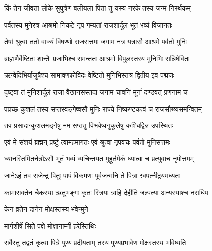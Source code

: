 \twolineshloka
{किं तेन जीवता लोके सुपुत्रेण बलीयला}
{पिता तु यस्य नरके तस्य जन्म निरर्थकम्} %


\twolineshloka
{पर्वतस्य मुनेरत्र आश्रमो निकटे नृप}
{गम्यतां राजशार्दूल भूतं भव्यं विजानतः} %

\twolineshloka
{तेषां श्रुत्वा ततो वाक्यं विषण्णो राजसत्तमः}
{जगाम नत्र यत्रासौ आश्रमे पर्वतो मुनिः} %

\twolineshloka
{ब्राह्मणैर्वेष्टितः शान्तैः प्रजाभिश्च समन्ततः}
{आश्रमो विपुलस्तस्य मुनिभिः सन्निषेवितः} %

\twolineshloka
{ऋग्वेदिभिर्याजुषैश्च सामावणकोविदः}
{वेष्टितो मुनिभिस्तत्र द्वितीय इव पद्मजः} %

\twolineshloka
{दृष्ट्वा तं मुनिशार्दूलं राजा वैखानसस्तदा}
{जगाम चावनिं मूर्ना दण्डवत् प्रणनाम च} %

\twolineshloka
{पप्रच्छ कुशलं तस्य सप्तस्वङ्गेष्वसौ मुनिः}
{राज्ये निष्कण्टकत्वं च राजसौख्यसमन्वितम्} %


\twolineshloka
{तव प्रसादान्कुशलमङ्गेषु मम सप्ततु}
{विभवेष्वनुकूलेषु कश्चिद्विन्न उपस्थितः} %

\twolineshloka
{एवं मे संशयं ब्रह्मन् प्रष्टुं त्वामहमागतः}
{एवं श्रुत्वा नृपवचः पर्वतो मुनिसत्तमः} %

\twolineshloka
{ध्यानस्तिमितनेत्रोऽसौ भूतं भव्यं व्यचिन्तयत}
{मुहूर्तमेकं ध्यात्वा च प्रत्युवाच नृपोत्तमम्} %


\twolineshloka
{जानेऽहं तव राजेन्द्र पितुः पापं विकमणः}
{पूर्वजन्मनि ते पित्रा स्वपत्नीद्रयमध्यतः} %

\twolineshloka
{कामासक्तेन चैकस्या ऋतुभङ्गः कृतः स्त्रियः}
{त्राहि देहीति जल्पत्या अन्यस्याश्च नराधिप} %



\onelineshloka
{केन व्रतेन दानेन मोक्षस्तस्य भवेन्मुने} %



\onelineshloka
{मार्गशीर्षे सिते पक्षे मोक्षानाम्नी हरेस्तिथिः} %

\twolineshloka
{सर्वैस्तु तद्वतं कृत्वा पित्रे पुण्यं प्रदीयताम्}
{तस्य पुण्यप्रभावेण मोक्षस्तस्य भविष्यति} %

